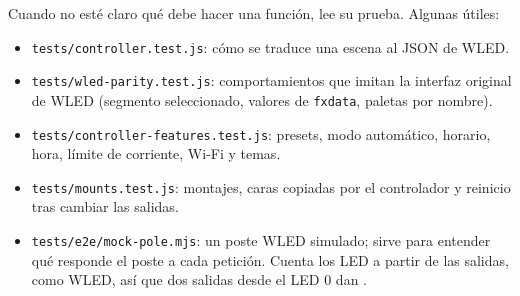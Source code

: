Cuando no esté claro qué debe hacer una función, lee su prueba. Algunas útiles:
\begin{itemize}
\item \texttt{tests/controller.test.js}: cómo se traduce una escena al JSON de WLED.
\item \texttt{tests/wled-parity.test.js}: comportamientos que imitan la interfaz original de WLED (segmento seleccionado, valores de \texttt{fxdata}, paletas por nombre).
\item \texttt{tests/controller-features.test.js}: presets, modo automático, horario, hora, límite de corriente, Wi-Fi y temas.
\item \texttt{tests/mounts.test.js}: montajes, caras copiadas por el controlador y reinicio tras cambiar las salidas.
\item \texttt{tests/e2e/mock-pole.mjs}: un poste WLED simulado; sirve para entender qué responde el poste a cada petición. Cuenta los LED a partir de las salidas, como WLED, así que dos salidas desde el LED 0 dan .
\end{itemize}
